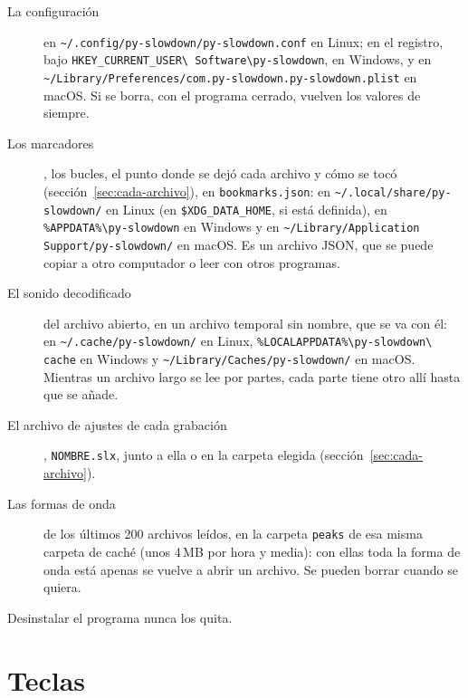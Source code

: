 \documentclass[12pt,
              article,
              oneside
              ]{memoir}
\begin{document}
%
\begin{description}
\item[La configuración] en
  \texttt{\textasciitilde/.config/py-slowdown/py-slowdown.conf} en Linux; en
  el registro, bajo \texttt{HKEY\_CURRENT\_USER\textbackslash
  Software\textbackslash py-slowdown}, en Windows, y en
  \texttt{\textasciitilde/Library/Preferences/com.py-slowdown.py-slowdown.plist}
  en macOS. Si se borra, con el programa cerrado, vuelven los valores de
  siempre.
\item[Los marcadores], los bucles, el punto donde se dejó cada archivo y
  cómo se tocó (sección~\ref{sec:cada-archivo}), en
  \texttt{bookmarks.json}: en \texttt{\textasciitilde/.local/share/py-slowdown/}
  en Linux (en \texttt{\$XDG\_DATA\_HOME}, si está definida), en
  \texttt{\%APPDATA\%\textbackslash py-slowdown} en Windows y en
  \texttt{\textasciitilde/Library/Application Support/py-slowdown/} en macOS.
  Es un archivo JSON, que se puede copiar a otro computador o leer con
  otros programas.
\item[El sonido decodificado] del archivo abierto, en un archivo temporal
  sin nombre, que se va con él: en \texttt{\textasciitilde/.cache/py-slowdown/}
  en Linux, \texttt{\%LOCALAPPDATA\%\textbackslash py-slowdown\textbackslash
  cache} en Windows y \texttt{\textasciitilde/Library/Caches/py-slowdown/} en
  macOS. Mientras un archivo largo se lee por partes, cada parte tiene otro
  allí hasta que se añade.
\item[El archivo de ajustes de cada grabación], \texttt{NOMBRE.slx}, junto a
  ella o en la carpeta elegida (sección~\ref{sec:cada-archivo}).
\item[Las formas de onda] de los últimos 200 archivos leídos, en la carpeta
  \texttt{peaks} de esa misma carpeta de caché (unos 4\,MB por hora y
  media): con ellas toda la forma de onda está apenas se vuelve a abrir un
  archivo. Se pueden borrar cuando se quiera.
\end{description}

\noindent Desinstalar el programa nunca los quita.

\section{Teclas}
\end{document}
